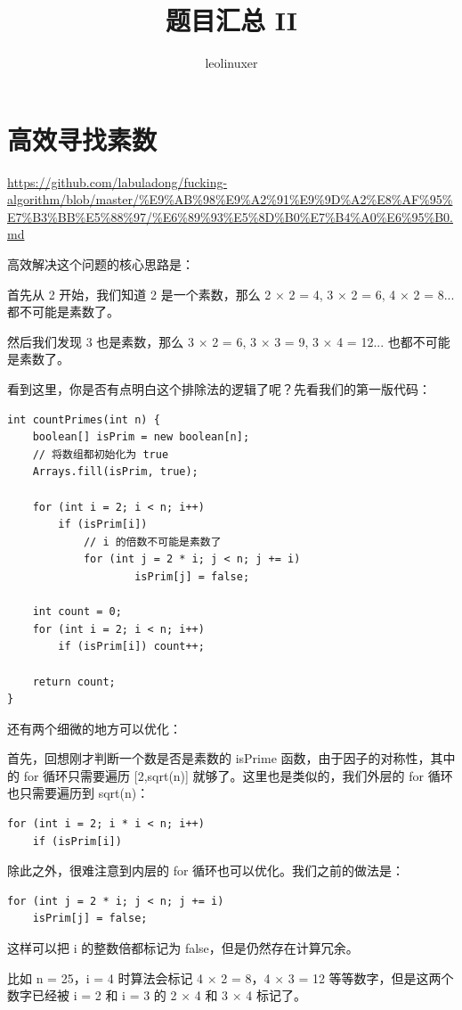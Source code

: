 \documentclass[12pt]{article}
\title{题目汇总 II}
\author{leolinuxer}
\begin{document}
\maketitle
\tableofcontents

\section{高效寻找素数}
\url{https://github.com/labuladong/fucking-algorithm/blob/master/%E9%AB%98%E9%A2%91%E9%9D%A2%E8%AF%95%E7%B3%BB%E5%88%97/%E6%89%93%E5%8D%B0%E7%B4%A0%E6%95%B0.md}

高效解决这个问题的核心思路是：

首先从 2 开始，我们知道 2 是一个素数，那么 2 × 2 = 4, 3 × 2 = 6, 4 × 2 = 8... 都不可能是素数了。

然后我们发现 3 也是素数，那么 3 × 2 = 6, 3 × 3 = 9, 3 × 4 = 12... 也都不可能是素数了。

看到这里，你是否有点明白这个排除法的逻辑了呢？先看我们的第一版代码：
\begin{lstlisting}
int countPrimes(int n) {
    boolean[] isPrim = new boolean[n];
    // 将数组都初始化为 true
    Arrays.fill(isPrim, true);

    for (int i = 2; i < n; i++) 
        if (isPrim[i]) 
            // i 的倍数不可能是素数了
            for (int j = 2 * i; j < n; j += i) 
                    isPrim[j] = false;
    
    int count = 0;
    for (int i = 2; i < n; i++)
        if (isPrim[i]) count++;
    
    return count;
}
\end{lstlisting}

还有两个细微的地方可以优化：

首先，回想刚才判断一个数是否是素数的 isPrime 函数，由于因子的对称性，其中的 for 循环只需要遍历 [2,sqrt(n)] 就够了。这里也是类似的，我们外层的 for 循环也只需要遍历到 sqrt(n)：
\begin{lstlisting}
for (int i = 2; i * i < n; i++) 
    if (isPrim[i]) 
\end{lstlisting}

除此之外，很难注意到内层的 for 循环也可以优化。我们之前的做法是：
\begin{lstlisting}
for (int j = 2 * i; j < n; j += i) 
    isPrim[j] = false;
\end{lstlisting}

这样可以把 i 的整数倍都标记为 false，但是仍然存在计算冗余。

比如 n = 25，i = 4 时算法会标记 4 × 2 = 8，4 × 3 = 12 等等数字，但是这两个数字已经被 i = 2 和 i = 3 的 2 × 4 和 3 × 4 标记了。
\end{document}
